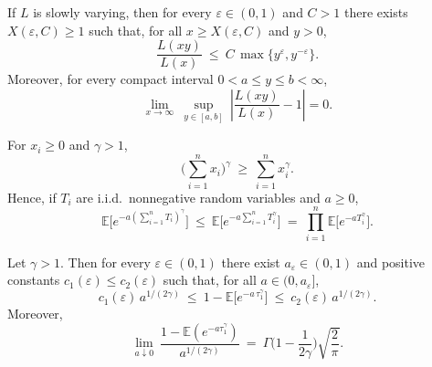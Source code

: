 \documentclass[10pt,a4paper]{amsart}
\newcommand{\EE}{\mathbb{E}}
\begin{document}
\begin{lemma}\label{lem:potter-EN-eps}
If $L$ is slowly varying, then for every $\varepsilon\in(0,1)$ and $C>1$ there exists $X(\varepsilon,C)\ge 1$ such that, for all $x\ge X(\varepsilon,C)$ and $y>0$,
\begin{equation}\label{eq:potter-EN-eps}
\frac{L(xy)}{L(x)}\ \le\ C\,\max\{y^\varepsilon,y^{-\varepsilon}\}.
\end{equation}
Moreover, for every compact interval $0<a\le y\le b<\infty$,
\begin{equation}\label{eq:UCT-EN-eps}
\lim_{x\to\infty}\ \sup_{y\in[a,b]}\ \left|\frac{L(xy)}{L(x)}-1\right|=0.
\end{equation}
\end{lemma}

\begin{lemma}\label{lem:convex-ineq-EN-eps}
For $x_i\ge 0$ and $\gamma> 1$,
\begin{equation}\label{eq:superadd}
\Big(\sum_{i=1}^n x_i\Big)^{\gamma}\ \ge\ \sum_{i=1}^n x_i^{\gamma}.
\end{equation}
Hence, if $T_i$ are i.i.d.\ nonnegative random variables and $a\ge0$,
\begin{equation}\label{eq:prod-bound-EN-eps}
\EE\!\big[e^{-a(\sum_{i=1}^n T_i)^\gamma}\big]
\ \le\ \EE\!\big[e^{-a\sum_{i=1}^n T_i^\gamma}\big]
\ =\ \prod_{i=1}^n \EE\!\big[e^{-a T_i^\gamma}\big].
\end{equation}
\end{lemma}

\begin{lemma}\label{lem:tauber-Tgamma-EN-eps}
Let $\gamma>1$. Then for every $\varepsilon\in(0,1)$ there exist $a_\varepsilon\in(0,1)$ and positive constants $c_1(\varepsilon)\le c_2(\varepsilon)$ such that, for all $a\in(0,a_\varepsilon]$,
\begin{equation}\label{eq:Lap-two-sided-EN-eps}
c_1(\varepsilon)\,a^{1/(2\gamma)}\ \le\ 1-\EE\!\big[e^{-a\,\tau_1^\gamma}\big]\ \le\ c_2(\varepsilon)\,a^{1/(2\gamma)}.
\end{equation}
Moreover,
\begin{equation}\label{eq:Lap-limit-EN-eps}
\lim_{a\downarrow 0}\ \frac{1-\EE(e^{-a \tau_1^\gamma})}{a^{1/(2\gamma)}}\ =\ \Gamma\!\Big(1-\frac{1}{2\gamma}\Big)\sqrt{\frac{2}{\pi}}.
\end{equation}
\end{lemma}
\end{document}

